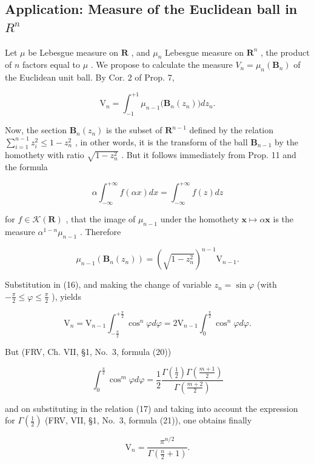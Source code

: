 \subsection{\texorpdfstring{Application: Measure of the Euclidean ball in \(R^{n}\)}{Application: Measure of the Euclidean ball in R to the n}}

Let \(\mu\) be Lebesgue measure on \(\mathbf{R}\) , and \(\mu_n\) Lebesgue measure on \(\mathbf{R}^n\) , the product of \(n\) factors equal to \(\mu\) . We propose to calculate the measure \(V_n = \mu_n(\mathbf{B}_n)\) of the Euclidean unit ball. By Cor. 2 of Prop. 7,

\[
\mathrm{V} _ {n} = \int_ {- 1} ^ {+ 1} \mu_ {n - 1} \big (\mathbf {B} _ {n} (z _ {n}) \big) d z _ {n}.\tag{16}
\]

Now, the section \(\mathbf{B}_n(z_n)\) is the subset of \(\mathbf{R}^{n-1}\) defined by the relation \(\sum_{i=1}^{n-1} z_i^2 \leqslant 1 - z_n^2\) , in other words, it is the transform of the ball \(\mathbf{B}_{n-1}\) by the homothety with ratio \(\sqrt{1 - z_n^2}\) . But it follows immediately from Prop. 11 and the formula

\[
\alpha \int_ {- \infty} ^ {+ \infty} f (\alpha x) d x = \int_ {- \infty} ^ {+ \infty} f (z) d z
\]

for \(f \in \mathcal{K}(\mathbf{R})\) , that the image of \(\mu_{n-1}\) under the homothety \(\mathbf{x} \mapsto \alpha \mathbf{x}\) is the measure \(\alpha^{1-n} \mu_{n-1}\) . Therefore

\[
\mu_ {n - 1} \left(\mathbf {B} _ {n} \left(z _ {n}\right)\right) = \left(\sqrt {1 - z _ {n} ^ {2}}\right) ^ {n - 1} \mathrm{V} _ {n - 1}.
\]

Substitution in (16), and making the change of variable \(z_{n} = \sin \varphi\) (with \(-\frac{\pi}{2} \leqslant \varphi \leqslant \frac{\pi}{2}\) ), yields

\[
\mathrm{V} _ {n} = \mathrm{V} _ {n - 1} \int_ {- \frac {\pi}{2}} ^ {+ \frac {\pi}{2}} \cos^ {n} \varphi d \varphi = 2 \mathrm{V} _ {n - 1} \int_ {0} ^ {\frac {\pi}{2}} \cos^ {n} \varphi d \varphi .\tag{17}
\]

But (FRV, Ch. VII, §1, No.~3, formula (20))

\[
\int_ {0} ^ {\frac {\pi}{2}} \cos^ {m} \varphi d \varphi = \frac {1}{2} \frac {\Gamma \left(\frac {1}{2}\right) \Gamma \left(\frac {m + 1}{2}\right)}{\Gamma \left(\frac {m + 2}{2}\right)}
\]

and on substituting in the relation (17) and taking into account the expression for \(\Gamma(\frac{1}{2})\) (FRV, VII, §1, No.~3, formula (21)), one obtains finally

\[
\mathrm{V} _ {n} = \frac {\pi^ {n / 2}}{\Gamma \left(\frac {n}{2} + 1\right)}.\tag{18}
\]

